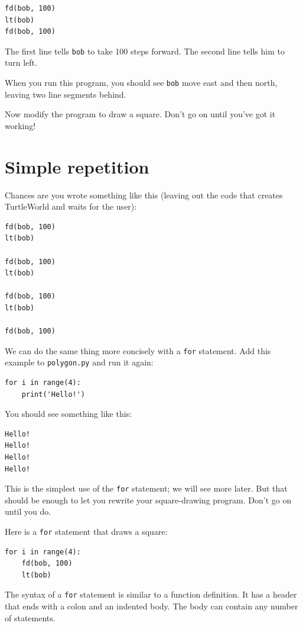 \documentclass[10pt]{book}
\begin{document}
\beforeverb
\begin{verbatim}
fd(bob, 100)
lt(bob)
fd(bob, 100)
\end{verbatim}
\afterverb
%
The first line tells {\tt bob} to take 100 steps
forward.  The second line tells him to turn left.

When you run this program, you should see {\tt bob} move east and then
north, leaving two line segments behind.

Now modify the program to draw a square.  Don't go on until
you've got it working!


\section{Simple repetition}
\label{repetition}

Chances are you wrote something like this (leaving out the code
that creates TurtleWorld and waits for the user):

\begin{verbatim}
fd(bob, 100)
lt(bob)

fd(bob, 100)
lt(bob)

fd(bob, 100)
lt(bob)

fd(bob, 100)
\end{verbatim}
%
We can do the same thing more concisely with a {\tt for} statement.
Add this example to {\tt polygon.py} and run it again:


\beforeverb
\begin{verbatim}
for i in range(4):
    print('Hello!')
\end{verbatim}
\afterverb
%
You should see something like this:

\beforeverb
\begin{verbatim}
Hello!
Hello!
Hello!
Hello!
\end{verbatim}
\afterverb
%
This is the simplest use of the {\tt for} statement; we will see
more later.  But that should be enough to let you rewrite your
square-drawing program.  Don't go on until you do.


Here is a {\tt for} statement that draws a square:

\beforeverb
\begin{verbatim}
for i in range(4):
    fd(bob, 100)
    lt(bob)
\end{verbatim}
\afterverb
%
The syntax of a {\tt for} statement is similar to a function
definition.  It has a header that ends with a colon and an indented
body.  The body can contain any number of statements.
\end{document}
